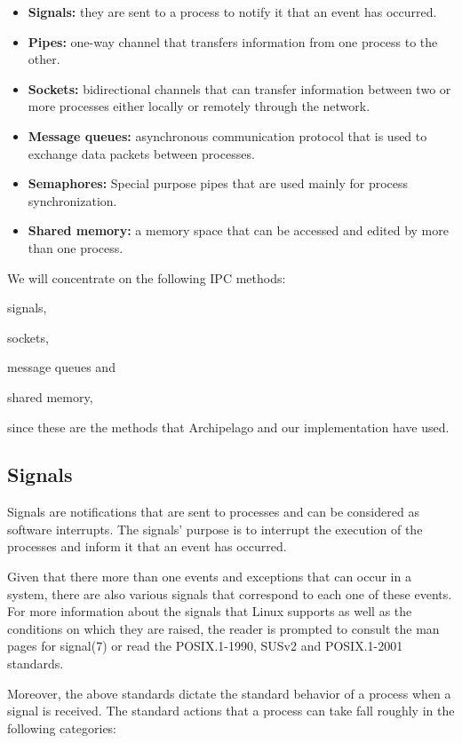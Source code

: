 \begin{itemize}
	\item \textbf{Signals:} they are sent to a process to notify it that an 
		event has occurred.
	\item \textbf{Pipes:} one-way channel that transfers information from 
		one process to the other.
	\item \textbf{Sockets:} bidirectional channels that can transfer 
		information between two or more processes either locally or 
		remotely through the network.
	\item \textbf{Message queues:} asynchronous communication protocol that 
		is used to exchange data packets between processes.
	\item \textbf{Semaphores:} Special purpose pipes that are used mainly 
		for process synchronization.
	\item \textbf{Shared memory:} a memory space that can be accessed and 
		edited by more than one process.
\end{itemize}

We will concentrate on the following IPC methods:
\begin{inparaenum}[i)]
\item signals,
\item sockets,
\item message queues and
\item shared memory,
\end{inparaenum}
since these are the methods that Archipelago and our implementation have used.

\subsection{Signals}

Signals are notifications that are sent to processes and can be considered as 
software interrupts. The signals' purpose is to interrupt the execution of the 
processes and inform it that an event has occurred.

Given that there more than one events and exceptions that can occur in a 
system, there are also various signals that correspond to each one of these
events. For more information about the signals that Linux supports as well as 
the conditions on which they are raised, the reader is prompted to consult the 
man pages for signal(7) or read the POSIX.1-1990, SUSv2 and POSIX.1-2001 
standards.
  
Moreover, the above standards dictate the standard behavior of a process when a 
signal is received. The standard actions that a process can take fall roughly 
in the following categories:


